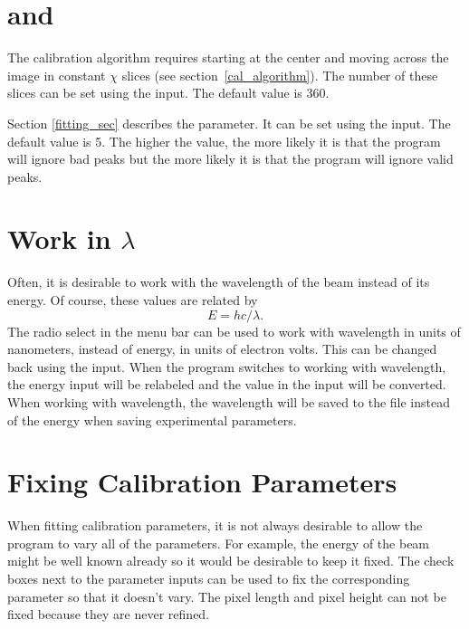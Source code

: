\section{\texorpdfstring{ 
        and }{``Number of 
        Chi'' and ``Stddev?''}}
        \label{num_chi_and_stddev}

The calibration algorithm requires starting
at the center and moving across the image in constant
$\chi$ slices (see section~\ref{cal_algorithm}).
The number of these slices 
can be set using the  input. 
The default value is 360. 

Section \ref{fitting_sec} describes the  parameter.
It can be set using the 
 input. The default value is 5. The higher 
the value, the more likely it is that the program will ignore
bad peaks but the more likely it is that the program
will ignore valid peaks.

\section{\texorpdfstring{Work in 
    $\lambda$}{Work in Lambda}}
    \label{workWavelength}

Often, it is desirable to work with the wavelength 
of the beam instead of its energy. Of course, these
values are related by
\begin{equation}
    E=hc/\lambda.
\end{equation}
The  radio select in the menu bar
can be used to work with wavelength in units of nanometers, 
instead of energy, in units of electron volts. 
This can be changed back using the  input.
When the program switches to working with wavelength,
the energy input  will be relabeled
\gui{$\lambda$} and the value in the input will be converted.
When working with wavelength, the 
wavelength will be saved to the file instead of the energy when
saving experimental parameters.

\section{Fixing Calibration Parameters}
\label{fix_parameters}

When fitting calibration parameters, it is not
always desirable to allow the program to vary
all of the parameters. For example,
the energy of the beam might be well known already
so it would be desirable to keep it fixed.
The  check boxes next to the parameter
inputs can be used to fix the corresponding parameter
so that it doesn't vary.
The pixel length and pixel height can not be fixed 
because they are never refined. 

